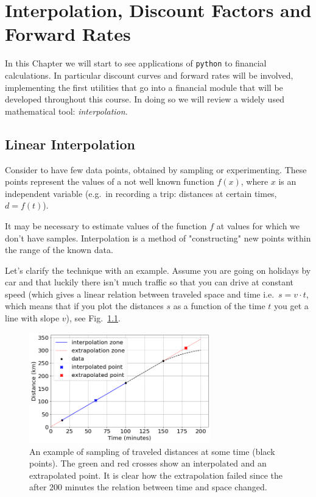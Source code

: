 \chapter{Interpolation, Discount Factors and Forward Rates}
\label{interpolation---practical-lesson-3}

In this Chapter we will start to see applications of \texttt{python} to financial calculations.
In particular discount curves and forward rates will be involved, implementing the first utilities that go into a financial module that will be developed throughout this course.
In doing so we will review a widely used mathematical tool: \emph{interpolation}.

\section{Linear Interpolation}
\label{linear-interpolation}

Consider to have few data points, obtained by sampling or experimenting. These points represent the values of a not well known function \(f(x)\), where \(x\) is an independent variable (e.g.~in recording a trip: distances at certain times, \(d = f(t)\)).

It may be necessary to estimate values of the function $f$ at values for which we don't have samples. Interpolation is a method of "constructing" new points within the range of the known data.

Let's clarify the technique with an example.
Assume you are going on holidays by car and that luckily there isn't much traffic so that you can drive at constant speed (which gives a linear relation between traveled space and time i.e.~\(s = v \cdot t\), which means that if you plot the distances \(s\) as a function of the time \(t\) you get a line with slope \(v\)), see Fig.~\ref{fig:samples_for_interpolation}.

\begin{figure}
  \centering
  \includegraphics[width=0.7\textwidth]{figures/interp_example1.png}
  \caption{An example of sampling of traveled distances at some time (black points). The green and red crosses show an interpolated and an extrapolated point. It is clear how the extrapolation failed since the after 200 minutes the relation between time and space changed.}
  \label{fig:samples_for_interpolation}
\end{figure}


